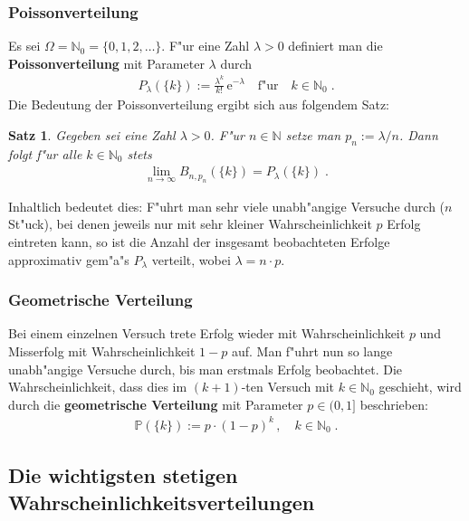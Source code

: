 \documentclass[ngerman,draft,parskip=half,twoside]{scrartcl}
\newtheorem{thm}{Satz}[section]
\newcommand*{\N}{\mathbb{N}}      %
\newcommand*{\WKM}{\mathbb{P}}      %
\begin{document}
\subsubsection{Poissonverteilung}
Es sei $\Omega=\N_0=\{0,1,2,\ldots\}$. F"ur eine Zahl $\lambda>0$ definiert
man die \textbf{Poissonverteilung} mit Parameter $\lambda$ durch
\begin{gather*}
  P_\lambda(\{k\}):= \frac{\lambda^k}{k !}\,\mathrm e^{-\lambda}\quad\mbox{f"ur}\quad k\in\N_0\;.
\end{gather*}
Die Bedeutung der Poissonverteilung ergibt sich aus folgendem Satz:
\begin{thm}
Gegeben sei eine Zahl $\lambda>0$. F"ur $n\in\N$ setze man
$p_n:=\lambda/n$. Dann folgt f"ur alle $k\in\N_0$
stets
  \begin{gather*}
    \lim_{n\to\infty} B_{n,p_n}(\{k\})= P_\lambda(\{k\})\;.
  \end{gather*}
\end{thm}
Inhaltlich bedeutet dies: F"uhrt man sehr viele unabh"angige Versuche durch ($n$ St"uck), bei denen jeweils
nur mit sehr kleiner
Wahrscheinlichkeit $p$ Erfolg eintreten kann, so ist die Anzahl der insgesamt beobachteten Erfolge
approximativ gem"a"s $P_\lambda$ verteilt, wobei $\lambda= n\cdot p$.
\subsubsection{Geometrische Verteilung}
Bei einem einzelnen Versuch trete Erfolg wieder mit Wahrscheinlichkeit $p$ und Misserfolg
mit Wahrscheinlichkeit $1-p$ auf. Man f"uhrt nun so lange unabh"angige Versuche durch, bis
man erstmals Erfolg beobachtet. Die Wahrscheinlichkeit, dass dies im $(k+1)$-ten Versuch mit
$k\in\N_0$ geschieht, wird durch die \textbf{geometrische Verteilung} mit Parameter $p\in(0,1]$
beschrieben:
\begin{gather*}
  \WKM(\{k\}):= p\cdot(1-p)^k\,,\quad k\in\N_0\;.
\end{gather*}
\subsection{Die wichtigsten stetigen Wahrscheinlichkeitsverteilungen}
\end{document}
